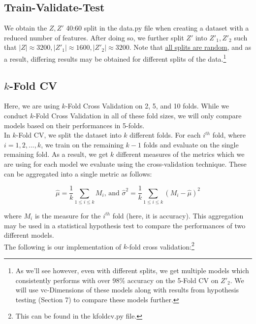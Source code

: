 \documentclass[fleqn]{article}
\begin{document}
    \subsection{Train-Validate-Test}
    We obtain the $ Z, Z' $ 40:60 split in the data.py file when creating a dataset
    with a reduced number of features. After doing so, we further split $ Z' $ into
    $ Z'_1, Z'_2 $ such that $ |Z| \approx 3200, |Z'_1| \approx 1600, |Z'_2| \approx 3200 $.
    Note that \underline{all splits are random}, and as a result, differing
    results may be obtained for different splits of the data.\footnote{As we'll see however,
    even with different splits, we get multiple models which consistently performs with
    over 98\% accuracy on the 5-Fold CV on $ Z'_2 $. We will use vc-Dimensions of these
    models along with results from hypothesis testing (Section 7) to compare these models
    further.}

    \subsection{$k$-Fold CV}

    Here, we are using $k$-Fold Cross Validation on 2, 5, and 10 folds. While we conduct
    $k$-Fold Cross Validation in all of these fold sizes, we will only compare models based on
    their performances in 5-folds.\\

    In $k$-Fold CV, we
    split the dataset into $k$ different folds. For each $i^{th}$ fold, where
    $ i = 1, 2,...,k $, we train on the remaining $ k-1 $ folds and evaluate on the single
    remaining fold. As a result, we get $ k $ different measures of the metrics which we
    are using for each model we evaluate using the cross-validation technique. These can
    be aggregated into a single metric as follows:

    $$  \hat\mu = \frac{1}{k} \sum_{1\leq i \leq k} M_i \text{, and }
        \hat\sigma^2 = \frac{1}{k} \sum_{1\leq i \leq k} (M_i - \hat\mu)^2 $$

    \noindent
    where $ M_i $ is the measure for the $i^{th}$ fold (here, it is accuracy). This
    aggregation may be used in a statistical hypothesis test to compare the performances
    of two different models.\\

    \noindent
    The following is our implementation of $k$-fold cross validation:\footnote{This can be
    found in the kfoldcv.py file.}
\end{document}
